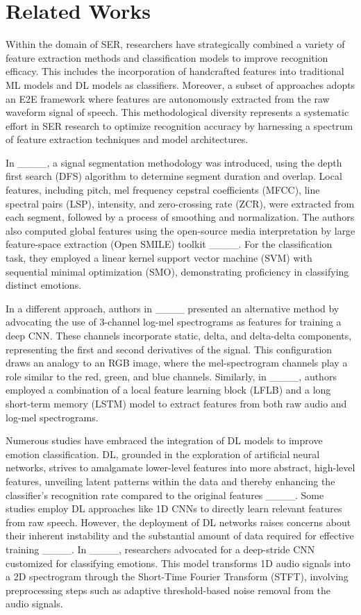 \section{Related Works}
\label{related_works}

Within the domain of SER, researchers have strategically combined a variety of feature extraction methods and classification models to improve recognition efficacy. This includes the incorporation of handcrafted features into traditional ML models and DL models as classifiers. Moreover, a subset of approaches adopts an E2E framework where features are autonomously extracted from the raw waveform signal of speech. This methodological diversity represents a systematic effort in SER research to optimize recognition accuracy by harnessing a spectrum of feature extraction techniques and model architectures.

In ____, a signal segmentation methodology was introduced, using the depth first search (DFS) algorithm to determine segment duration and overlap. Local features, including pitch, mel frequency cepstral coefficients (MFCC), line spectral pairs (LSP), intensity, and zero-crossing rate (ZCR), were extracted from each segment, followed by a process of smoothing and normalization. The authors also computed global features using the open-source media interpretation by large feature-space extraction (Open SMILE) toolkit ____. For the classification task, they employed a linear kernel support vector machine (SVM) with sequential minimal optimization (SMO), demonstrating proficiency in classifying distinct emotions.

In a different approach, authors in ____ presented an alternative method by advocating the use of 3-channel log-mel spectrograms as features for training a deep CNN. These channels incorporate static, delta, and delta-delta components, representing the first and second derivatives of the signal. This configuration draws an analogy to an RGB image, where the mel-spectrogram channels play a role similar to the red, green, and blue channels. Similarly, in ____, authors employed a combination of a local feature learning block (LFLB) and a long short-term memory (LSTM) model to extract features from both raw audio and log-mel spectrograms.


Numerous studies have embraced the integration of DL models to improve emotion classification. DL, grounded in the exploration of artificial neural networks, strives to amalgamate lower-level features into more abstract, high-level features, unveiling latent patterns within the data and thereby enhancing the classifier's recognition rate compared to the original features ____. Some studies employ DL approaches like 1D CNNs to directly learn relevant features from raw speech. However, the deployment of DL networks raises concerns about their inherent instability and the substantial amount of data required for effective training ____. In ____, researchers advocated for a deep-stride CNN customized for classifying emotions. This model transforms 1D audio signals into a 2D spectrogram through the Short-Time Fourier Transform (STFT), involving preprocessing steps such as adaptive threshold-based noise removal from the audio signals.

